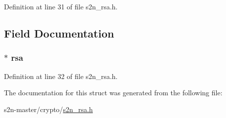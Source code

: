 Definition at line 31 of file s2n\+\_\+rsa.\+h.



\subsection{Field Documentation}
\subsubsection[{\texorpdfstring{rsa}{rsa}}]{$\ast$ rsa}\hypertarget{structs2n__rsa__private__key_abe5e4dd8049eff80d7e599d751f143f8}{}\label{structs2n__rsa__private__key_abe5e4dd8049eff80d7e599d751f143f8}


Definition at line 32 of file s2n\+\_\+rsa.\+h.



The documentation for this struct was generated from the following file\+:\begin{DoxyCompactItemize}
\item 
s2n-\/master/crypto/\hyperlink{s2n__rsa_8h}{s2n\+\_\+rsa.\+h}\end{DoxyCompactItemize}
